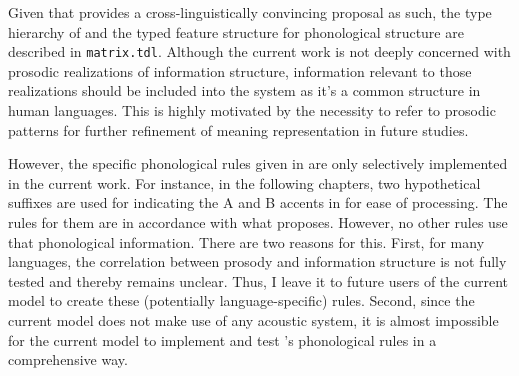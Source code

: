 


Given that \citet{bildhauer:07} provides a cross-linguistically
convincing proposal as such, the type hierarchy of  and the
typed feature structure for phonological structure are described in
\texttt{matrix.tdl}.  Although the current work is not deeply
concerned with prosodic realizations of information structure,
information relevant to those realizations should be included into the
system as it's a common structure in human languages. This is highly
motivated by the necessity to refer to prosodic patterns for further
refinement of meaning representation in future studies.



However, the specific phonological rules given in
 are only selectively implemented in the
current work. For instance, in the following chapters, two
hypothetical suffixes are used for indicating the A and B accents in
 for ease of processing.  The rules for them are in
accordance with what \citet{bildhauer:07} proposes. However, no other
rules use that phonological information. There are two reasons for
this. First, for many languages, the correlation between
prosody and information structure is not fully tested and thereby
remains unclear. Thus, I leave it to future users of the current model
to create these (potentially language-specific) rules. Second, since
the current model does not make use of any acoustic system, it is
almost impossible for the current model to implement and test
\citeauthor{bildhauer:07}'s phonological rules in a comprehensive way.




